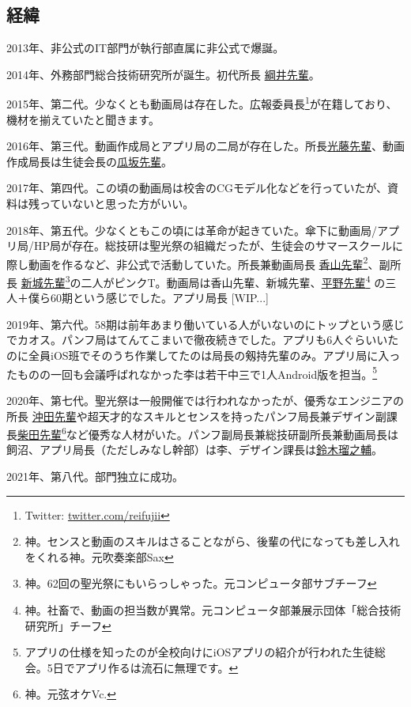 \documentclass[dvipdfmx,jb5]{jarticle}
\newcommand{\mail}[2]{\href{mailto:#2}{#1}}
\begin{document}
\subsection{経緯}
2013年、非公式のIT部門が執行部直属に非公式で爆誕。

2014年、外務部門総合技術研究所が誕生。初代所長 \mail{綱井先輩}{53127tsunai@seiko.ac.jp}。

2015年、第二代。少なくとも動画局は存在した。広報委員長\footnote{Twitter: \url{twitter.com/reifujii}}が在籍しており、機材を揃えていたと聞きます。

2016年、第三代。動画作成局とアプリ局の二局が存在した。所長\mail{光藤先輩}{55201mitsudo@seiko.ac.jp}、動画作成局長は生徒会長の\mail{瓜坂先輩}{55031urisaka@seiko.ac.jp}。

2017年、第四代。この頃の動画局は校舎のCGモデル化などを行っていたが、資料は残っていないと思った方がいい。

2018年、第五代。少なくともこの頃には革命が起きていた。傘下に動画局/アプリ局/HP局が存在。総技研は聖光祭の組織だったが、生徒会のサマースクールに際し動画を作るなど、非公式で活動していた。所長兼動画局長 \mail{香山先輩}{57084koyama@seiko.ac.jp}\footnote{神。センスと動画のスキルはさることながら、後輩の代になっても差し入れをくれる神。元吹奏楽部Sax}、副所長 \mail{新城先輩}{57011araki@seiko.ac.jp}\footnote{神。62回の聖光祭にもいらっしゃった。元コンピュータ部サブチーフ}の二人がピンクT。動画局は香山先輩、新城先輩、\mail{平野先輩}{57174hirano@seiko.ac.jp}\footnote{ 神。社畜で、動画の担当数が異常。元コンピュータ部兼展示団体「総合技術研究所」チーフ} の三人＋僕ら60期という感じでした。アプリ局長 [WIP...]

2019年、第六代。58期は前年あまり働いている人がいないのにトップという感じでカオス。パンフ局はてんてこまいで徹夜続きでした。アプリも6人ぐらいいたのに全員iOS班でそのうち作業してたのは局長の剱持先輩のみ。アプリ局に入ったものの一回も会議呼ばれなかった李は若干中三で1人Android版を担当。\footnote{アプリの仕様を知ったのが全校向けにiOSアプリの紹介が行われた生徒総会。5日でアプリ作るは流石に無理です。}

2020年、第七代。聖光祭は一般開催では行われなかったが、優秀なエンジニアの所長 \mail{沖田先輩}{59039okita@seiko.ac.jp}や超天才的なスキルとセンスを持ったパンフ局長兼デザイン副課長\mail{柴田先輩}{59091shibataseiko.ac.jp}\footnote{神。元弦オケVc.}など優秀な人材がいた。パンフ副局長兼総技研副所長兼動画局長は飼沼、アプリ局長（ただしみなし幹部）は李、デザイン課長は\mail{鈴木瑠之輔}{60111suzuki@seiko.ac.jp}。

2021年、第八代。部門独立に成功。
\end{document}
